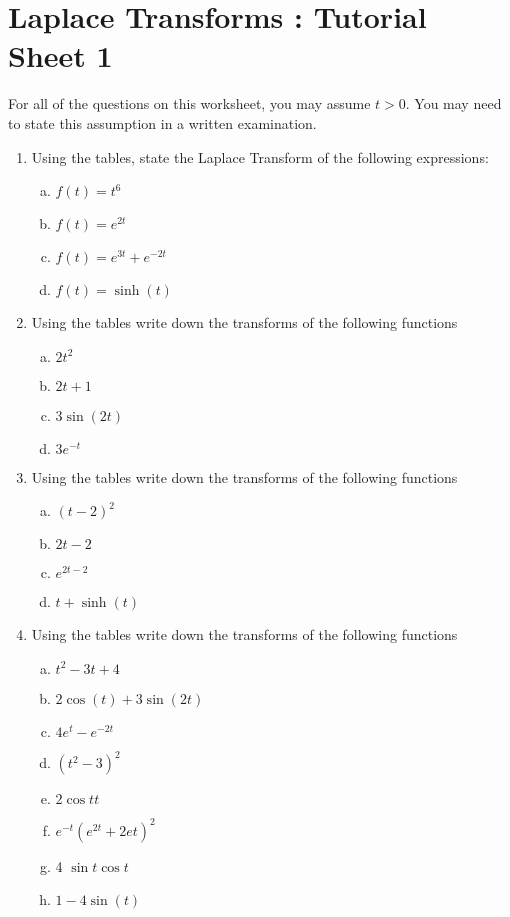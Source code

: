 \documentclass[a4paper,12pt]{article}
\begin{document}
\section*{Laplace Transforms : Tutorial Sheet 1}
For all of the questions on this worksheet, you may assume $t>0$. 
You may need to state this assumption in a written examination.
\begin{enumerate}
\item Using the tables, state the Laplace Transform of the following expressions: 
\begin{multicols}{2}
\begin{enumerate}[(a)]
    \item $ f(t) = t^6 $
    \item $ f(t) = e^{2t} $
    \item $ f(t) = e^{3t} + e^{-2t} $
    \item $ f(t) = \sinh(t) $
\end{enumerate}
\end{multicols}
\item Using the tables write down the transforms of the following functions 
\begin{multicols}{2}
\begin{enumerate}[(a)]
    \item $2t^2$
    \item  $2t+1$
    \item $3\sin(2t)$ 
    \item $3e^{-t}$ 
\end{enumerate}
\end{multicols}

\item Using the tables write down the transforms of the following functions 
\begin{multicols}{2}
\begin{enumerate}[(a)]
\item  $(t-2)^2$

\item  $2t-2$ 
\item  $e^{2t-2}$ 
\item  $t + \sinh(t)$

\end{enumerate}
\end{multicols}
\item
Using the tables write down the transforms of the following functions 
\begin{multicols}{2}
\begin{enumerate}[(a)]
\item  $t^2 - 3t + 4$ 
\item  $2 \cos(t) + 3 \sin(2t)$ \item $4e^t - e^{-2t}$ 
\item  $(t^2 - 3)^2 $
\item $2 \cos t t$ 
\item $e^{-t}(e^{2t} + 2e{t})^2$ 
\item 4 $\sin t \cos t$ 
\item $1 - 4 \sin(t)$ 
\end{enumerate}
\end{multicols}


\end{enumerate}
\end{document}
